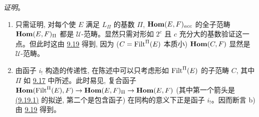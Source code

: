 \noindent \emph{证明}。
\begin{enumerate}
\renewcommand{\theenumi}{\alph{enumi}}
\renewcommand{\labelenumi}{\theenumi)}
\item 只需证明, 对每个使 $E$ 满足 $L_{\Pi}$ 的基数 $\Pi$, $\operatorname{\mathbf{Hom}}(E,F)_{acc}$ 的全子范畴 $\operatorname{\mathbf{Hom}}(E,F)_{\Pi}$ 都是 $𝒰$-范畴。显然只需对形如 $2^c$ 且 $c$ 充分大的基数验证这一点。但此时这由 \hyperref[I.cor9.19]{9.19} 得到, 因为 ($C=\operatorname{Filt}^{\Pi}(E)$ 本质小) $\operatorname{\mathbf{Hom}}(C,F)$ 显然是 $𝒰$-范畴。

\item 由函子 $i_{!}$ 构造的传递性, 在陈述中可以只考虑形如 $\operatorname{Filt}^{\Pi}(E)$ 的子范畴 $C$, 其中 $\Pi$ 如 \hyperref[I.cor9.17]{9.17} 中所述。此时易见, 复合函子 $\operatorname{\mathbf{Hom}}(\operatorname{Filt}^{\Pi}(E),F)\rightarrow
\operatorname{\mathbf{Hom}}(E,F)_{\Pi}\rightarrow \operatorname{\mathbf{Hom}}(E,F)$ (其中第一个箭头是 \hyperlink{sga4.exp.I.equation.9.19.1}{(9.19.1)} 的拟逆, 第二个是包含函子) 在同构的意义下正是函子 $i_{!}$。因而断言 b) 由 \hyperref[I.cor9.19]{9.19} 得到。
\end{enumerate}

